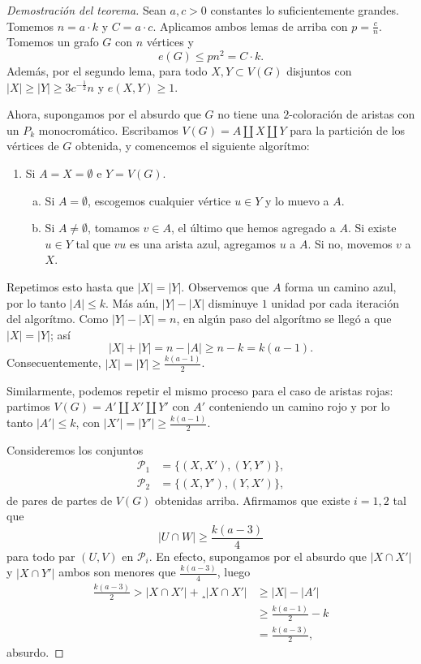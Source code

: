 \documentclass[12pt]{report}
\theoremstyle{plain}
\theoremstyle{definition}
\newcommand{\abs}[1]{\left \vert #1 \right \vert}
\begin{document}
\begin{proof}[Demostración del teorema]
Sean $a,c >0$ constantes lo suficientemente grandes. Tomemos $n = a \cdot k$ y $C = a \cdot c$. Aplicamos ambos lemas de arriba con $p = \frac c n$. Tomemos un grafo $G$ con $n$ vértices y
\[
    e(G) \leq pn^2 = C \cdot k  .
\]
Además, por el segundo lema, para todo $X,Y \subset V(G)$ disjuntos con $\abs X \geq \abs Y \geq 3 c^{- \frac 1 2}n$ y $e(X,Y) \geq 1$.

Ahora, supongamos por el absurdo que $G$ no tiene una $2$-coloración de aristas con un $P_k$ monocromático. Escribamos $V(G) = A \coprod X \coprod Y$ para la partición de los vértices de $G$ obtenida, y comencemos el siguiente algorítmo:
\begin{enumerate}
\item Si $A = X = \emptyset$ e $Y = V(G)$.
    \begin{enumerate}[(a)]
    \item Si $A = \emptyset$, escogemos cualquier vértice $u \in Y$ y lo muevo a $A$.
    \item Si $A \neq \emptyset$, tomamos $v \in A$, el último que hemos agregado a $A$. Si existe $u \in Y$ tal que $v u$ es una arista azul, agregamos $u$ a $A$. Si no, movemos $v$ a $X$.
    \end{enumerate}
\end{enumerate}
Repetimos esto hasta que $\abs X = \abs Y$. Observemos que $A$ forma un camino azul, por lo tanto $\abs A \leq k$. Más aún, $\abs Y - \abs X$ disminuye $1$ unidad por cada iteración del algorítmo. Como $\abs Y - \abs X = n$, en algún paso del algorítmo se llegó a que $\abs X = \abs Y$; así
\[
    \abs X + \abs Y = n - \abs A \geq n - k = k (a-1).
\]
Consecuentemente, $\abs X = \abs Y \geq \frac {k (a-1)}{2}$.

Similarmente, podemos repetir el mismo proceso para el caso de aristas rojas: partimos $V(G) = A' \coprod X' \coprod Y'$ con $A'$ conteniendo un camino rojo y por lo tanto $\abs {A'} \leq k$, con $\abs{X'} = \abs{Y'} \geq \frac{k(a-1)}{2}$.

Consideremos los conjuntos
\begin{align*}
\mathcal P_1 &= \{(X,X'), (Y,Y')\}, \\
\mathcal P_2 &= \{(X,Y'), (Y, X')\},
\end{align*}
de pares de partes de $V(G)$ obtenidas arriba. Afirmamos que existe $i = 1,2$ tal que
\[
    \abs{U \cap W} \geq \frac{k (a-3)}{4}
\]
para todo par $(U,V)$ en $\mathcal P_i$. En efecto, supongamos por el absurdo que $\abs{X \cap X'}$ y $\abs{X \cap Y'}$ ambos son menores que $\frac{k(a-3)}4$, luego
\begin{align*}
\frac{k(a-3)}{2} > \abs{X \cap X'} + ¸\abs{X \cap X'} &\geq \abs X - \abs{A'} \\
&\geq \frac{k(a-1)}{2} - k \\
&= \frac{k(a-3)}{2},
\end{align*}
absurdo.


\end{proof}
\end{document}
